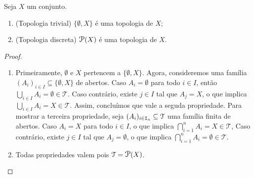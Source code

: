 \begin{prop}
	Seja $X$ um conjunto.
	\begin{enumerate}
	\item (Topologia trivial) $\{\emptyset,X\}$ é uma topologia de $X$;
	\item (Topologia discreta) $\p(X)$ é uma topologia de $X$.
	\end{enumerate}
\end{prop}
\begin{proof}
	\begin{enumerate}
	\item Primeiramente, $\emptyset$ e $X$ pertencem a $\{\emptyset,X\}$. Agora, consideremos uma família $(A_i)_{i \in I} \subseteq \{\emptyset,X\}$ de abertos. Caso $A_i = \emptyset$ para todo $i \in I$, então $\bigcup_{i \in I} A_i = \emptyset \in \mathcal T$. Caso contrário, existe $j \in I$ tal que $A_j = X$, o que implica $\bigcup_{i \in I} A_i = X \in \mathcal T$. Assim, concluímos que vale a seguda propriedade. Para mostrar a terceira propriedade, seja $(A_i)_{i \in \mathtt I_n} \subseteq \mathcal T$ uma família finita de abertos. Caso $A_i=X$ para todo $i \in I$, o que implica $\bigcap_{i=1}^n A_i = X \in \mathcal T$, Caso contrário, existe $j \in I$ tal que $A_j = \emptyset$, o que implica $\bigcap_{i=1}^n A_i = \emptyset \in \mathcal T$.

	\item Todas propriedades valem pois $\mathcal T = \p(X)$.
\qedhere
	\end{enumerate}
\end{proof}


